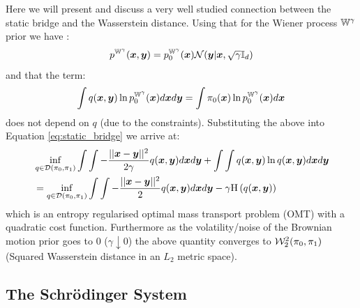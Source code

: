 \documentclass[a4paper,12pt,twoside,openright]{report}
\theoremstyle{definition}
\begin{document}
Here we will present and discuss a very well studied \citep{mikami2008optimal,leonard2012schrodinger,leonard2013survey,carlier2017convergence} connection between the static bridge and the Wasserstein distance.  Using that for the Wiener process $\mathbb{W}^\gamma$ prior we have :
\begin{align}
    p^{\mathbb{W}^{\gamma}}({\bm{x}},{\bm{y}}) = p^{\mathbb{W}^{\gamma}}_0({\bm{x}}){\mathcal{N}}({\bm{y}} | {\bm{x}}, \sqrt{\gamma}{\mathbb{I}_d})
\end{align}
and that the term:
\begin{align*}
    \int q({\bm{x}}, {\bm{y}})\ln  p^{\mathbb{W}^{\gamma}}_0({\bm{x}}) d{\bm{x}} d{\bm{y}} =  \int \pi_0({\bm{x}}) \ln  p^{\mathbb{W}^{\gamma}}_0({\bm{x}}) d{\bm{x}}  
\end{align*}
does not depend on $q$ (due to the constraints). Substituting the above into Equation \ref{eq:static_bridge} we arrive at:
\begin{align}
    &\inf _{q \in {\mathcal{D}}(\pi_0, \pi_1)}\int \int -\frac{||{\bm{x}} - {\bm{y}} ||^2}{2\gamma} q({\bm{x}}, {\bm{y}}) d{\bm{x}} d{\bm{y}}  + \int \int q({\bm{x}}, {\bm{y}}) \ln q({\bm{x}}, {\bm{y}}) d{\bm{x}} d{\bm{y}} \nonumber \\
    &=\inf _{q \in {\mathcal{D}}(\pi_0, \pi_1)}\int \int -\frac{||{\bm{x}} - {\bm{y}} ||^2}{2} q({\bm{x}}, {\bm{y}}) d{\bm{x}} d{\bm{y}}  - \gamma \text{H} \left(q({\bm{x}}, {\bm{y}})\right)
\end{align}
which is an entropy regularised optimal mass transport problem (OMT) \citep{villani2003topics} with a quadratic cost function. Furthermore as the volatility/noise of the Brownian motion prior goes to 0 ($\gamma \downarrow 0$) the above quantity converges to ${\mathcal{W}}^2_{2}(\pi_0, \pi_1)$ (Squared Wasserstein distance in an $L_2$ metric space).
\subsection{The Schrödinger System}
\end{document}
